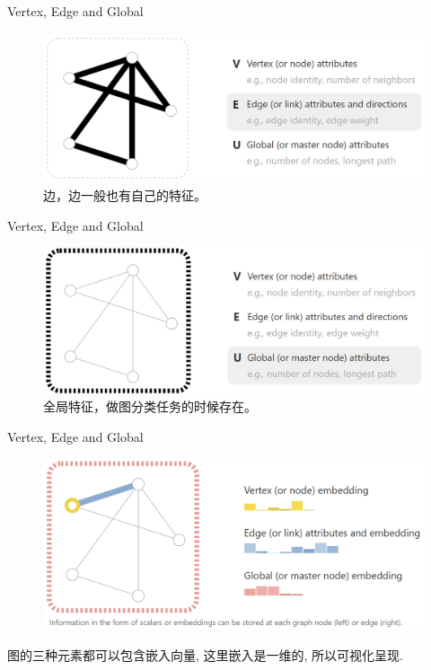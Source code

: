 \documentclass{beamer}
\begin{document}
\begin{frame}{Vertex, Edge and Global}
    \begin{figure}
        \includegraphics[width=\textwidth]{edge.png}
        \caption{边，边一般也有自己的特征。}
    \end{figure}
\end{frame}

\begin{frame}{Vertex, Edge and Global}
    \begin{figure}
        \includegraphics[width=\textwidth]{global.png}
        \caption{全局特征，做图分类任务的时候存在。}
    \end{figure}
\end{frame}

\begin{frame}{Vertex, Edge and Global}
    \begin{figure}
        \includegraphics[width=\textwidth]{graph.png}
    \end{figure}
    图的三种元素都可以包含嵌入向量, 这里嵌入是一维的, 所以可视化呈现.
\end{frame}
\end{document}
